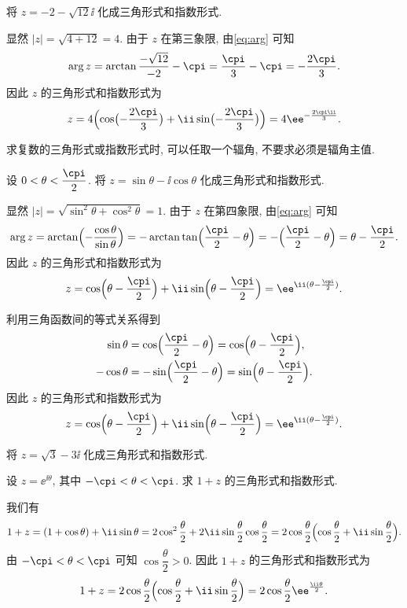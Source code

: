 \begin{example}
  将 $z=-2-\sqrt{12}\ii$ 化成三角形式和指数形式.
\end{example}

\begin{solution}
  显然 $|z|=\sqrt{4+12}=4$.
  由于 $z$ 在第三象限, 由\eqref{eq:arg} 可知
  \[
     \arg z
    =\arctan\frac{-\sqrt{12}}{-2}-\cpi
    =\frac\cpi3-\cpi
    =-\frac{2\cpi}3.
  \]
  因此 $z$ 的三角形式和指数形式为
  \[
     z
    =4\Bigl(\cos\bigl(-\frac{2\cpi}3\bigr)+\ii\sin\bigl(-\frac{2\cpi}3\bigr)\Bigr)
    =4\ee^{-\frac{2\cpi \ii}3}.
  \]
\end{solution}

求复数的三角形式或指数形式时, 可以任取一个辐角, 不要求必须是辐角主值.

\begin{example}
  设 $0<\theta<\dfrac\cpi2$.
  将 $z=\sin\theta-\ii\cos\theta$ 化成三角形式和指数形式.
\end{example}
\begin{solution}[解法一]
  显然 $|z|=\sqrt{\sin^2\theta+\cos^2\theta}=1$. 由于 $z$ 在第四象限, 由\eqref{eq:arg} 可知
  \[
     \arg z
    =\arctan\Bigl(-\frac{\cos\theta}{\sin\theta}\Bigr)
    =-\arctan\tan\Bigl(\frac\cpi2-\theta\Bigr)
    =-\Bigl(\frac\cpi2-\theta\Bigr)
    =\theta-\frac\cpi2.
  \]
  因此 $z$ 的三角形式和指数形式为
  \[
     z
    =\cos\Bigl(\theta-\frac\cpi2\Bigr)+\ii\sin\Bigl(\theta-\frac\cpi2\Bigr)
    =\ee^{\ii(\theta-\frac\cpi2)}.
  \]
\end{solution}

\begin{solution}[解法二]
  利用三角函数间的等式关系得到
  \begin{align*}
      \sin\theta
    &=\cos\Bigl(\frac\cpi2-\theta\Bigr)
     =\cos\Bigl(\theta-\frac\cpi2\Bigr),\\
      -\cos\theta
    &=-\sin\Bigl(\frac\cpi2-\theta\Bigr)
     =\sin\Bigl(\theta-\frac\cpi2\Bigr).
  \end{align*}
  因此 $z$ 的三角形式和指数形式为
  \[
     z
    =\cos\Bigl(\theta-\frac\cpi2\Bigr)+\ii\sin\Bigl(\theta-\frac\cpi2\Bigr)
    =\ee^{\ii(\theta-\frac\cpi2)}.
  \]
\end{solution}

\begin{exercise}
  将 $z=\sqrt 3-3\ii$ 化成三角形式和指数形式.
\end{exercise}

\begin{example}
  设 $z=\ee^{\ii\theta}$, 其中 $-\cpi<\theta<\cpi$.
  求 $1+z$ 的三角形式和指数形式.
\end{example}
\begin{solution}
  我们有
  \[
     1+z
    =(1+\cos\theta)+\ii\sin\theta
    =2\cos^2\frac\theta2+2\ii\sin\frac\theta2\cos\frac\theta2
    =2\cos\frac\theta2\Bigl(\cos\frac\theta2+\ii\sin\frac\theta2\Bigr).
  \]
  由 $-\cpi<\theta<\cpi$ 可知 $\cos\dfrac\theta2>0$.
  因此 $1+z$ 的三角形式和指数形式为
  \[
     1+z
    =2\cos\frac\theta2\Bigl(\cos\frac\theta2+\ii\sin\frac\theta2\Bigr)
    =2\cos\frac\theta2\ee^{\frac{\ii\theta}2}.
  \]
\end{solution}

